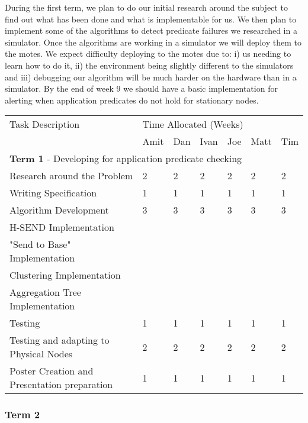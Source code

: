 \documentclass[a4paper]{article}
\begin{document}
During the first term, we plan to do our initial research around the subject to find out what has been done and what is implementable for us. We then plan to implement some of the algorithms to detect predicate failures we researched in a simulator. Once the algorithms are working in a simulator we will deploy them to the motes. We expect difficulty deploying to the motes due to: i) us needing to learn how to do it, ii) the environment being slightly different to the simulators and iii) debugging our algorithm will be much harder on the hardware than in a simulator. By the end of week 9 we should have a basic implementation for alerting when application predicates do not hold for stationary nodes.

\begin{table}[H]
	\centering
	\begin{tabular}{| l | l | l | l | l | l | l |}
	Task Description & \multicolumn{6}{|l|}{Time Allocated (Weeks)}\\
	~ & Amit & Dan & Ivan & Joe & Matt & Tim \\
	\hline
	\hline
	\multicolumn{7}{|l|}{\textbf{Term 1} - Developing for application predicate checking} \\
	\hline


	Research around the Problem & 2 & 2 & 2 & 2 & 2 & 2\\
	Writing Specification & 1 & 1 & 1 & 1 & 1 & 1\\
	Algorithm Development & 3 & 3 & 3 & 3 & 3 & 3\\
	H-SEND Implementation & ~ & ~ & ~ & ~ & ~ & ~\\
	"Send to Base" Implementation & ~ & ~ & ~ & ~ & ~ & ~\\
	Clustering Implementation & ~ & ~ & ~ & ~ & ~ & ~\\
	Aggregation Tree Implementation & ~ & ~ & ~ & ~ & ~ & ~\\
	Testing & 1 & 1 & 1 & 1 & 1 & 1\\
	Testing and adapting to Physical Nodes & 2 & 2 & 2 & 2 & 2 & 2\\
	Poster Creation and Presentation preparation & 1 & 1 & 1 & 1 & 1 & 1\\

	\hline
	
	\end{tabular}
\end{table}

\subsubsection{Term 2}
\end{document}
